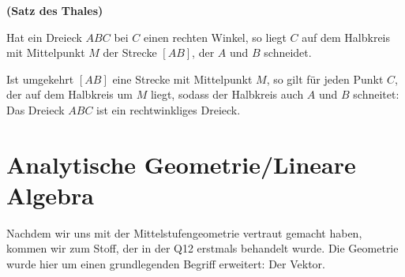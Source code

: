 \documentclass[ngerman, 12pt]{nssheetxea}
\begin{document}
\begin{theorem} \textbf{(Satz des Thales)} \par
Hat ein Dreieck $ABC$ bei $C$ einen rechten Winkel, so liegt $C$ auf dem Halbkreis mit Mittelpunkt $M$ der Strecke $[AB]$, der $A$ und $B$ schneidet. \par
Ist umgekehrt $[AB]$ eine Strecke mit Mittelpunkt $M$, so gilt für jeden Punkt $C$, der auf dem Halbkreis um $M$ liegt, sodass der Halbkreis auch $A$ und $B$ schneitet: Das Dreieck $ABC$ ist ein rechtwinkliges Dreieck. 

\begin{center}
\end{center}
\end{theorem}
\newpage
\section{Analytische Geometrie/Lineare Algebra}

Nachdem wir uns mit der Mittelstufengeometrie vertraut gemacht haben, kommen wir zum Stoff, der in der Q12 erstmals behandelt wurde. Die Geometrie wurde hier um einen grundlegenden Begriff erweitert: Der Vektor. 
\end{document}
